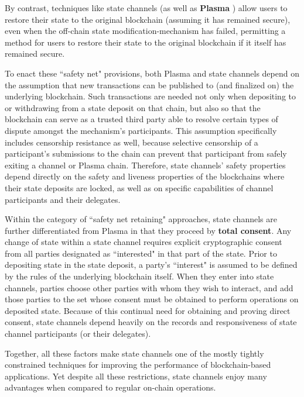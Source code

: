 \documentclass[prb,floatfix,reprint,nofootinbib,amsmath,amssymb,epsfig,pre,floats,letterpaper,groupedaffiliation,tightenlines,allcolors=blue,11pt]{revtex4}
\theoremstyle{definition}
\theoremstyle{definition}
\theoremstyle{definition}
\begin{document}
By contrast, techniques like state channels (as well as \textbf{Plasma} \cite{Poon_2017}) allow users to restore their state to the original blockchain (assuming it has remained secure), even when the off-chain state modification-mechanism has failed, permitting a method for users to restore their state to the original blockchain if it itself has remained secure.


To enact these ``safety net" provisions, both Plasma and state channels depend on the assumption that new transactions can be published to (and finalized on) the underlying blockchain. Such transactions are needed not only when depositing to or withdrawing from a state deposit on that chain, but also so that the blockchain can serve as a trusted third party able to resolve certain types of dispute amongst the mechanism's participants. This assumption specifically includes censorship resistance as well, because selective censorship of a participant's submissions to the chain can prevent that participant from safely exiting a channel or Plasma chain. Therefore, state channels' safety properties depend directly on the safety and liveness properties of the blockchains where their state deposits are locked, as well as on specific capabilities of channel participants and their delegates.

Within the category of ``safety net retaining" approaches, state channels are further differentiated from Plasma in that they proceed by \textbf{total consent}. Any change of state within a state channel requires explicit cryptographic consent from all parties designated as ``interested" in that part of the state. Prior to depositing state in the state deposit, a party's ``interest" is assumed to be defined by the rules of the underlying blockchain itself. When they enter into state channels, parties choose other parties with whom they wish to interact, and add those parties to the set whose consent must be obtained to perform operations on deposited state. Because of this continual need for obtaining and proving direct consent, state channels depend heavily on the records and responsiveness of state channel participants (or their delegates).

Together, all these factors make state channels one of the mostly tightly constrained techniques for improving the performance of blockchain-based applications. Yet despite all these restrictions, state channels enjoy many advantages when compared to regular on-chain operations.
\end{document}
